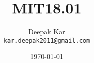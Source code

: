\documentclass{article}
\title{MIT18.01}
\author{Deepak Kar\\ \texttt{kar.deepak2011@gmail.com}} %
\date{\today} %
\begin{document}
\begin{titlingpage}
\maketitle %
\end{titlingpage}




\end{document}
